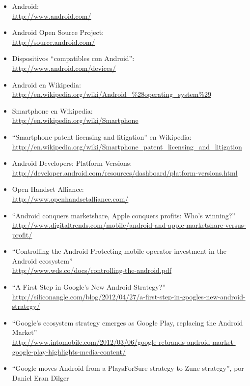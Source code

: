 \documentclass[a4paper,12pt]{article}
\begin{document}
\begin{itemize}
\item Android: \\
  \url{http://www.android.com/}
\item Android Open Source Project: \\
  \url{http://source.android.com/}
\item Dispositivos ``compatibles con Android'': \\
  \url{http://www.android.com/devices/}
\item Android en Wikipedia: \\
  \url{http://en.wikipedia.org/wiki/Android_%28operating_system%29}
\item Smartphone en Wikipedia: \\
  \url{http://en.wikipedia.org/wiki/Smartphone}
\item ``Smartphone patent licensing and litigation'' en Wikipedia: \\
  \url{http://en.wikipedia.org/wiki/Smartphone_patent_licensing_and_litigation}
\item Android Developers: Platform Versions: \\
  \url{http://developer.android.com/resources/dashboard/platform-versions.html}
\item Open Handset Alliance: \\
  \url{http://www.openhandsetalliance.com/}
\item ``Android conquers marketshare, Apple conquers profits: Who’s winning?'' \\
  \url{http://www.digitaltrends.com/mobile/android-and-apple-marketshare-versus-profit/}
\item ``Controlling the Android Protecting mobile operator investment in the Android ecosystem'' \\
  \url{http://www.wds.co/docs/controlling-the-android.pdf}
\item ``A First Step in Google’s New Android Strategy?'' \\
  \url{http://siliconangle.com/blog/2012/04/27/a-first-step-in-googles-new-android-strategy/}
\item ``Google’s ecosystem strategy emerges as Google Play, replacing the Android Market'' \\
  \url{http://www.intomobile.com/2012/03/06/google-rebrands-android-market-google-play-highlights-media-content/}
\item ``Google moves Android from a PlaysForSure strategy to Zune strategy'', por Daniel Eran Dilger \\

\end{itemize}
\end{document}
